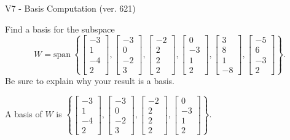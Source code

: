\begin{exercise}
  \begin{exerciseTitle}V7 - Basis Computation (ver. 621)\end{exerciseTitle}
  \begin{exerciseStatement}
    Find a basis for the subspace 
\[W=\mathrm{span}\ \left\{\left[\begin{array}{r}
-3 \\
1 \\
-4 \\
2
\end{array}\right] , \left[\begin{array}{r}
-3 \\
0 \\
-2 \\
3
\end{array}\right] , \left[\begin{array}{r}
-2 \\
2 \\
2 \\
2
\end{array}\right] , \left[\begin{array}{r}
0 \\
-3 \\
1 \\
2
\end{array}\right] , \left[\begin{array}{r}
3 \\
8 \\
1 \\
-8
\end{array}\right] , \left[\begin{array}{r}
-5 \\
6 \\
-3 \\
2
\end{array}\right]\right\}.\]
 Be sure to explain why your result is a basis.


  \end{exerciseStatement}
  \begin{exerciseAnswer}
   A basis of \(W\) is  \(\left\{\left[\begin{array}{r}
-3 \\
1 \\
-4 \\
2
\end{array}\right] , \left[\begin{array}{r}
-3 \\
0 \\
-2 \\
3
\end{array}\right] , \left[\begin{array}{r}
-2 \\
2 \\
2 \\
2
\end{array}\right] , \left[\begin{array}{r}
0 \\
-3 \\
1 \\
2
\end{array}\right]\right\}\).
  


  \end{exerciseAnswer}
\end{exercise}